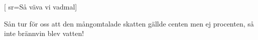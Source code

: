 


[ 	%
	sr={Så väva vi vadmal}]		%
	
\beginverse*		%
Sån tur för oss att den
mångomtalade skatten
gällde centen
men ej procenten,
så inte brännvin blev vatten! 
\endverse			%

\endsong			%

